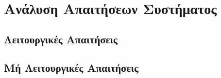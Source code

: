 \section{Ανάλυση Απαιτήσεων Συστήματος}

	\subsection{Λειτουργικές Απαιτήσεις}
	\subsection{Μή Λειτουργικές Απαιτήσεις}
